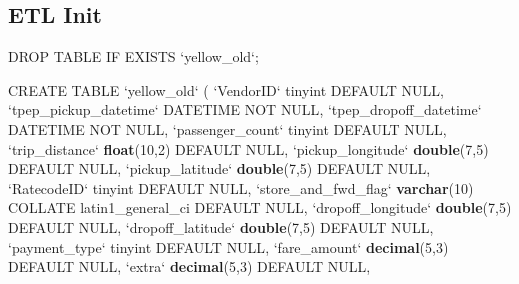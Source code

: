 \documentclass[12pt,twoside]{reedthesis}
\newenvironment{Shaded}{\begin{snugshade}}{\end{snugshade}}
\newcommand{\KeywordTok}[1]{\textcolor[rgb]{0.13,0.29,0.53}{\textbf{#1}}}
\newcommand{\DataTypeTok}[1]{\textcolor[rgb]{0.13,0.29,0.53}{#1}}
\newcommand{\DecValTok}[1]{\textcolor[rgb]{0.00,0.00,0.81}{#1}}
\newcommand{\StringTok}[1]{\textcolor[rgb]{0.31,0.60,0.02}{#1}}
\newcommand{\OtherTok}[1]{\textcolor[rgb]{0.56,0.35,0.01}{#1}}
\newcommand{\NormalTok}[1]{#1}
\theoremstyle{definition}
\theoremstyle{definition}
\theoremstyle{definition}
\theoremstyle{remark}
\begin{document}
\subsection{ETL Init}\label{etl-init}
\begin{Shaded}
\begin{Highlighting}[]
\NormalTok{DROP TABLE IF EXISTS }\StringTok{`}\DataTypeTok{yellow_old}\StringTok{`}\NormalTok{;}

\NormalTok{CREATE TABLE }\StringTok{`}\DataTypeTok{yellow_old}\StringTok{`}\NormalTok{ (}
 \StringTok{`}\DataTypeTok{VendorID}\StringTok{`}\NormalTok{ tinyint DEFAULT }\OtherTok{NULL}\NormalTok{,}
 \StringTok{`}\DataTypeTok{tpep_pickup_datetime}\StringTok{`}\NormalTok{ DATETIME NOT }\OtherTok{NULL}\NormalTok{,}
 \StringTok{`}\DataTypeTok{tpep_dropoff_datetime}\StringTok{`}\NormalTok{ DATETIME NOT }\OtherTok{NULL}\NormalTok{,}
 \StringTok{`}\DataTypeTok{passenger_count}\StringTok{`}\NormalTok{ tinyint DEFAULT }\OtherTok{NULL}\NormalTok{,}
 \StringTok{`}\DataTypeTok{trip_distance}\StringTok{`} \KeywordTok{float}\NormalTok{(}\DecValTok{10}\NormalTok{,}\DecValTok{2}\NormalTok{) DEFAULT }\OtherTok{NULL}\NormalTok{,}
 \StringTok{`}\DataTypeTok{pickup_longitude}\StringTok{`} \KeywordTok{double}\NormalTok{(}\DecValTok{7}\NormalTok{,}\DecValTok{5}\NormalTok{) DEFAULT }\OtherTok{NULL}\NormalTok{,}
 \StringTok{`}\DataTypeTok{pickup_latitude}\StringTok{`} \KeywordTok{double}\NormalTok{(}\DecValTok{7}\NormalTok{,}\DecValTok{5}\NormalTok{) DEFAULT }\OtherTok{NULL}\NormalTok{,}
 \StringTok{`}\DataTypeTok{RatecodeID}\StringTok{`}\NormalTok{ tinyint DEFAULT }\OtherTok{NULL}\NormalTok{,}
 \StringTok{`}\DataTypeTok{store_and_fwd_flag}\StringTok{`} \KeywordTok{varchar}\NormalTok{(}\DecValTok{10}\NormalTok{) COLLATE latin1_general_ci DEFAULT }\OtherTok{NULL}\NormalTok{,}
 \StringTok{`}\DataTypeTok{dropoff_longitude}\StringTok{`} \KeywordTok{double}\NormalTok{(}\DecValTok{7}\NormalTok{,}\DecValTok{5}\NormalTok{) DEFAULT }\OtherTok{NULL}\NormalTok{,}
 \StringTok{`}\DataTypeTok{dropoff_latitude}\StringTok{`} \KeywordTok{double}\NormalTok{(}\DecValTok{7}\NormalTok{,}\DecValTok{5}\NormalTok{) DEFAULT }\OtherTok{NULL}\NormalTok{,}
 \StringTok{`}\DataTypeTok{payment_type}\StringTok{`}\NormalTok{ tinyint DEFAULT }\OtherTok{NULL}\NormalTok{,}
 \StringTok{`}\DataTypeTok{fare_amount}\StringTok{`} \KeywordTok{decimal}\NormalTok{(}\DecValTok{5}\NormalTok{,}\DecValTok{3}\NormalTok{) DEFAULT }\OtherTok{NULL}\NormalTok{,}
 \StringTok{`}\DataTypeTok{extra}\StringTok{`} \KeywordTok{decimal}\NormalTok{(}\DecValTok{5}\NormalTok{,}\DecValTok{3}\NormalTok{) DEFAULT }\OtherTok{NULL}\NormalTok{,}

\end{Highlighting}
\end{Shaded}
\end{document}
